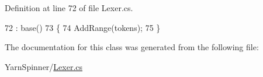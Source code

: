 Definition at line 72 of file Lexer.\-cs.


\begin{DoxyCode}
72                                                  : base()
73         \{
74             AddRange(tokens);
75         \}
\end{DoxyCode}


The documentation for this class was generated from the following file\-:\begin{DoxyCompactItemize}
\item 
Yarn\-Spinner/\hyperlink{a00298}{Lexer.\-cs}\end{DoxyCompactItemize}
